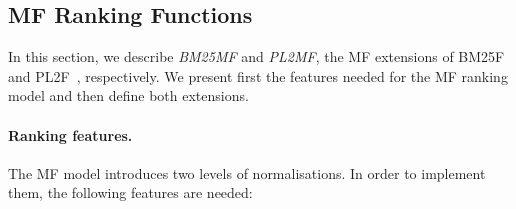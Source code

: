 %  		
%  		
%	  	

\subsection{MF Ranking Functions}
\label{sec:mf-function}

In this section, we describe \emph{\gls{BM25MF}} and \emph{\gls{PL2MF}}, the \gls{MF} extensions of BM25F~\cite{zaragoza:2004:microsoft} and PL2F~\cite{macdonald:2005:clef}, respectively.
We present first the features needed for the \gls{MF} ranking model and then define both extensions.

\paragraph{Ranking features.}

The \gls{MF} model introduces two levels of normalisations. In order to implement them, the following features are needed:


